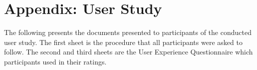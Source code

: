 \chapter{Appendix: User Study}\label{chapter:appendB}
The following presents the documents presented to participants of the conducted
user study. The first sheet is the procedure that all participants were asked to
follow. The second and third sheets are the User Experience Questionnaire
\cite{UEQHandbook} which participants used in their ratings.

